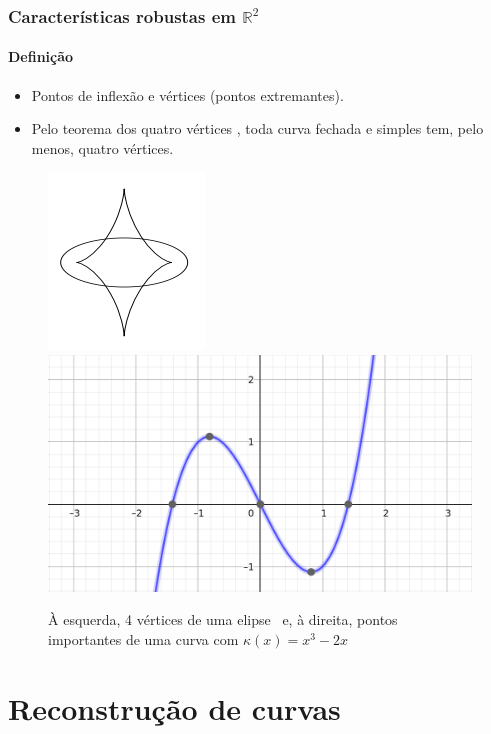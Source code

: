 \documentclass{beamer}
\begin{document}
    \begin{frame}
      \frametitle{Características robustas em $\mathbb{R}^2$}
      \framesubtitle{Definição}
        \begin{itemize}
          \item Pontos de inflexão e vértices (pontos extremantes).
          \bigskip
          \item Pelo teorema dos quatro vértices \cite{book_manfredo}, toda curva fechada e simples tem, pelo menos, quatro vértices.
        \end{itemize}
          \begin{figure}[hbt]
            \begin{center}
            \caption{À esquerda, 4 vértices de uma elipse~\cite{book_difgeosing} e, à direita, pontos importantes de uma curva com $\kappa(x) = x^3 - 2x$}
            \includegraphics[width=.2\textwidth]{./img/vertex.png}
            \quad
            \includegraphics[width=.4\textwidth]{./img/curva.png}
            \end{center}
          \end{figure}
    \end{frame}
    
    \section{Reconstrução de curvas}
    
\end{document}
